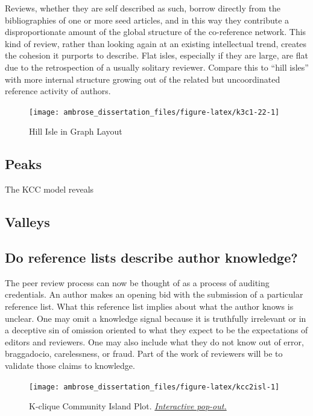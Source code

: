 \documentclass[]{book}
\theoremstyle{definition}
\theoremstyle{definition}
\theoremstyle{definition}
\theoremstyle{remark}
\begin{document}
Reviews, whether they are self described as such, borrow directly from
the bibliographies of one or more seed articles, and in this way they
contribute a disproportionate amount of the global structure of the
co-reference network. This kind of review, rather than looking again at
an existing intellectual trend, creates the cohesion it purports to
describe. Flat isles, especially if they are large, are flat due to the
retrospection of a usually solitary reviewer. Compare this to ``hill
isles'' with more internal structure growing out of the related but
uncoordinated reference activity of authors.

\begin{figure}

{\centering \texttt{[image: ambrose\_dissertation\_files/figure-latex/k3c1-22-1]} 

}

\caption{Hill Isle in Graph Layout}\label{fig:k3c1-22}
\end{figure}

\hypertarget{peaks}{%
\subsection{Peaks}\label{peaks}}

The KCC model reveals

\hypertarget{valleys}{%
\subsection{Valleys}\label{valleys}}

\hypertarget{do-reference-lists-describe-author-knowledge}{%
\subsection{Do reference lists describe author
knowledge?}\label{do-reference-lists-describe-author-knowledge}}

The peer review process can now be thought of as a process of auditing
credentials. An author makes an opening bid with the submission of a
particular reference list. What this reference list implies about what
the author knows is unclear. One may omit a knowledge signal because it
is truthfully irrelevant or in a deceptive sin of omission oriented to
what they expect to be the expectations of editors and reviewers. One
may also include what they do not know out of error, braggadocio,
carelessness, or fraud. Part of the work of reviewers will be to
validate those claims to knowledge.




\begin{figure}

{\centering \texttt{[image: ambrose\_dissertation\_files/figure-latex/kcc2isl-1]} 

}

\caption{K-clique Community Island Plot.
\href{exh/isl3d.html}{\emph{Interactive pop-out.}}}\label{fig:kcc2isl}
\end{figure}


\end{document}
